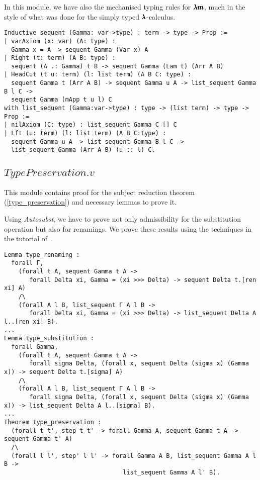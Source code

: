 In this module, we have also the mechanised typing rules for $\pmb{\lambda m}$, much in the style of what was done for the simply typed $\pmb{\lambda}$-calculus.
\begin{lstlisting}[language=Coq]
Inductive sequent (Gamma: var->type) : term -> type -> Prop := 
| varAxiom (x: var) (A: type) :
  Gamma x = A -> sequent Gamma (Var x) A
| Right (t: term) (A B: type) :
  sequent (A .: Gamma) t B -> sequent Gamma (Lam t) (Arr A B)
| HeadCut (t u: term) (l: list term) (A B C: type) :
  sequent Gamma t (Arr A B) -> sequent Gamma u A -> list_sequent Gamma B l C ->
  sequent Gamma (mApp t u l) C
with list_sequent (Gamma:var->type) : type -> (list term) -> type -> Prop :=
| nilAxiom (C: type) : list_sequent Gamma C [] C
| Lft (u: term) (l: list term) (A B C:type) :
  sequent Gamma u A -> list_sequent Gamma B l C ->
  list_sequent Gamma (Arr A B) (u :: l) C.
\end{lstlisting}

\subsection{\lst$TypePreservation.v$}

This module contains proof for the subject reduction theorem (\cref{type_preservation}) and necessary lemmas to prove it.

Using \textit{Autosubst}, we have to prove not only admissibility for the substitution operation but also for renamings.
We prove these results using the techniques in the tutorial of~\cite{AutosubstManual}.
\begin{lstlisting}[language=Coq]
Lemma type_renaming :
  forall Γ,
    (forall t A, sequent Gamma t A ->
       forall Delta xi, Gamma = (xi >>> Delta) -> sequent Delta t.[ren xi] A)
    /\
    (forall A l B, list_sequent Γ A l B ->
       forall Delta xi, Gamma = (xi >>> Delta) -> list_sequent Delta A l..[ren xi] B).
...
Lemma type_substitution :
  forall Gamma, 
    (forall t A, sequent Gamma t A ->
       forall sigma Delta, (forall x, sequent Delta (sigma x) (Gamma x)) -> sequent Delta t.[sigma] A)
    /\
    (forall A l B, list_sequent Γ A l B ->
       forall sigma Delta, (forall x, sequent Delta (sigma x) (Gamma x)) -> list_sequent Delta A l..[sigma] B).
...
Theorem type_preservation :
  (forall t t', step t t' -> forall Gamma A, sequent Gamma t A -> sequent Gamma t' A)
  /\
  (forall l l', step' l l' -> forall Gamma A B, list_sequent Gamma A l B ->
                                 list_sequent Gamma A l' B).
\end{lstlisting}

